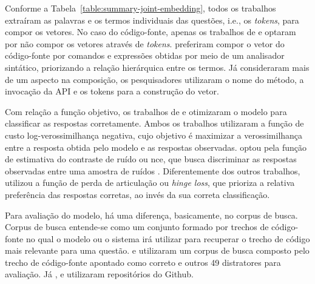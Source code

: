 Conforme a Tabela~\ref{table:summary-joint-embedding}, todos os trabalhos extraíram as palavras e os termos individuais das questões, i.e., os \textit{tokens}, para compor os vetores. No caso do código-fonte, apenas os trabalhos de \cite{Allamanis-bimodal-source-code-natural-language:2015} e \cite{Gu-deep-code-search:2018} optaram por não compor os vetores através de \textit{tokens}. \cite{Allamanis-bimodal-source-code-natural-language:2015} preferiram compor o vetor do código-fonte por comandos e expressões obtidas por meio de um analisador sintático, priorizando a relação hierárquica entre os termos. Já \cite{Gu-deep-code-search:2018} consideraram mais de um aspecto na composição, os pesquisadores utilizaram o nome do método, a invocação da API e os tokens para a construção do vetor.


Com relação a função objetivo, os trabalhos de \cite{iyer-etal-2016-summarizing} e \cite{Chen-bi-variational-autoencoder:2018} otimizaram o modelo para classificar as respostas corretamente. Ambos os trabalhos utilizaram a função de custo log-verossimilhança negativa, cujo objetivo é maximizar a verossimilhança entre a resposta obtida pelo modelo e as respostas observadas. \cite{Allamanis-bimodal-source-code-natural-language:2015} optou pela função de estimativa do contraste de ruído ou \acrfull{nce}, que busca discriminar as respostas observadas entre uma amostra de ruídos \citep{gutmann-nce-noise-contrastive-estimation-2010}. Diferentemente dos outros trabalhos, \cite{Gu-deep-code-search:2018} utilizou a função de perda de articulação ou \textit{hinge loss}, que prioriza a relativa preferência das respostas corretas, ao invés da sua correta classificação. 

Para avaliação do modelo, há uma diferença, basicamente, no corpus de busca. Corpus de busca entende-se como um conjunto formado por trechos de código-fonte no qual o modelo ou o sistema irá utilizar para recuperar o trecho de código mais relevante para uma questão. \cite{iyer-etal-2016-summarizing} e \cite{Chen-bi-variational-autoencoder:2018} utilizaram um corpus de busca composto pelo trecho de código-fonte apontado como correto e outros 49 distratores para avaliação. Já \cite{Gu-deep-code-search:2018}, \cite{Sachdev-neural-code-search:2018} e \cite{cambronero-deep-learning-code-search:2019} utilizaram repositórios do Github.  


